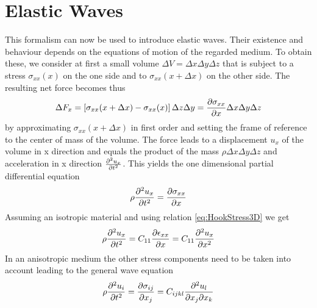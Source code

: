 \section{Elastic Waves}
This formalism can now be used to introduce elastic waves. Their existence and
behaviour depends on the equations of motion of the regarded medium. To obtain
these, we consider at first a small volume $\Delta V = \Delta x \Delta y
    \Delta z$ that is subject to a stress $\sigma_{xx}(x)$ on the one side and
to $\sigma_{xx}(x+\Delta x)$ on the other side. The resulting net force becomes
thus
\begin{equation}
    \Delta F_x = \left[ \sigma_{xx}(x+\Delta x)- \sigma_{xx}(x) \right] \Delta
    z \Delta y = \frac{\partial \sigma_{xx}}{\partial x} \Delta x \Delta y \Delta z
\end{equation}
by approximating $\sigma_{xx}(x+\Delta x)$ in first order and setting the frame
of reference to the center of mass of the volume.
The force leads to a displacement $u_x$ of the volume in x direction and equals
the
product of the mass $\rho\Delta x \Delta y \Delta z$ and acceleration in x
direction $\frac{\partial^2 u_x}{\partial t^2}$. This yields the one dimensional partial
differential equation
\begin{equation}
    \rho \frac{\partial^2 u_x}{\partial t^2} = \frac{\partial \sigma_{xx}}{\partial x}
\end{equation}
Assuming an isotropic material and using relation \ref{eq:HookStress3D} we
get
\begin{equation}
    \rho \frac{\partial^2 u_x}{\partial t^2} = C_{11} \frac{\partial \epsilon_{xx}}{\partial x} = C_{11}\frac{\partial^2 u_x}{\partial x^2}
\end{equation}
In an anisotropic medium the other stress components need to be taken into
account leading to the general wave equation
\begin{equation} \label{eq:wave_eq}
    \rho \frac{\partial^2 u_i}{\partial t^2} = \frac{\partial \sigma_{ij}}{\partial x_j} = C_{ijkl}
    \frac{\partial^2 u_l}{\partial x_j \partial x_k}
\end{equation}


